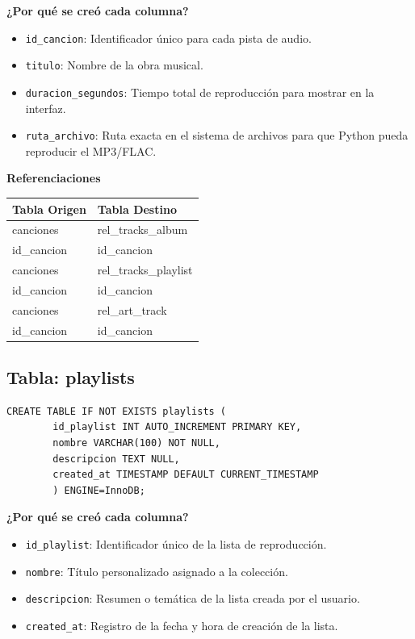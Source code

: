 \documentclass[11pt]{article}
\begin{document}
	\noindent\textbf{¿Por qué se creó cada columna?}
	\begin{itemize}[noitemsep,topsep=2pt]
		\item \texttt{id\_cancion}: Identificador único para cada pista de audio.
		\item \texttt{titulo}: Nombre de la obra musical.
		\item \texttt{duracion\_segundos}: Tiempo total de reproducción para mostrar en la interfaz.
		\item \texttt{ruta\_archivo}: Ruta exacta en el sistema de archivos para que Python pueda reproducir el MP3/FLAC.
	\end{itemize}
	
	\vspace{0.3cm}
	\noindent\textbf{Referenciaciones} \\[0.3em]
	\begin{tabular}{|l|l|}
		\hline
		\textbf{Tabla Origen} & \textbf{Tabla Destino} \\
		\hline
		canciones & rel\_tracks\_album \\
		id\_cancion & id\_cancion \\
		\hline
		canciones & rel\_tracks\_playlist \\
		id\_cancion & id\_cancion \\
		\hline
		canciones & rel\_art\_track \\
		id\_cancion & id\_cancion \\
		\hline
	\end{tabular}
	
	\vspace{0.5cm}
	
	\subsection{Tabla: playlists}
	\begin{lstlisting}[style=sqlstyle]
		CREATE TABLE IF NOT EXISTS playlists (
		id_playlist INT AUTO_INCREMENT PRIMARY KEY,
		nombre VARCHAR(100) NOT NULL,
		descripcion TEXT NULL,
		created_at TIMESTAMP DEFAULT CURRENT_TIMESTAMP
		) ENGINE=InnoDB;
	\end{lstlisting}
	
	\noindent\textbf{¿Por qué se creó cada columna?}
	\begin{itemize}[noitemsep,topsep=2pt]
		\item \texttt{id\_playlist}: Identificador único de la lista de reproducción.
		\item \texttt{nombre}: Título personalizado asignado a la colección.
		\item \texttt{descripcion}: Resumen o temática de la lista creada por el usuario.
		\item \texttt{created\_at}: Registro de la fecha y hora de creación de la lista.
	\end{itemize}
	
\end{document}
